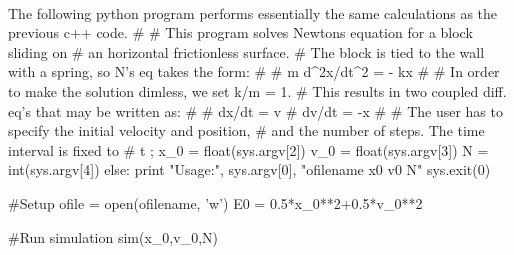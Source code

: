 \documentclass[%
oneside,                 %
final,                   %
10pt]{article}
\begin{document}
\paragraph{}
The following python program performs essentially the same calculations as the previous c++ code.
\bpypro
#
# This program solves Newtons equation for a block sliding on
# an horizontal frictionless surface.
# The block is tied to the wall with a spring, so N's eq takes the form:
#
#  m d^2x/dt^2 = - kx
#
# In order to make the solution dimless, we set k/m = 1.
# This results in two coupled diff. eq's that may be written as:
#
#  dx/dt = v
#  dv/dt = -x
#
# The user has to specify the initial velocity and position,
# and the number of steps. The time interval is fixed to
# t \in [0, 4\pi) (two periods)
#
# Note that this is a highly simplifyed rk4 code, intended
# for conceptual understanding and experimentation.

import sys
import numpy, math

#Global variables
ofile = None;
E0    = 0.0

def sim(x_0, v_0, N):
    ts = 0.0
    te = 4*math.pi
    h = (te-ts)/float(N)

    t = ts;
    x = x_0
    v = v_0
    while (t < te):
        kv1 = -h*x
        kx1 = h*v

        kv2 = -h*(x+kx1/2)
        kx2 =  h*(v+kv1/2)

        kv3 = -h*(x+kx2/2)
        kx3 =  h*(v+kv2/2)

        kv4 = -h*(x+kx3/2)
        kx4 =  h*(v+kv3/2)

        #Write the old values to file
        output(t,x,v)

        #Update
        x = x + (kx1 + 2*(kx2+kx3) + kx4)/6
        v = v + (kv1 + 2*(kv2+kv3) + kv4)/6
        t = t+h
        
def output(t,x,v):
    de = 0.5*x**2+0.5*v**2 - E0;
    ofile.write("%


#MAIN PROGRAM:

#Get input
if len(sys.argv) == 5:
    ofilename =       sys.argv[1];
    x_0       = float(sys.argv[2])
    v_0       = float(sys.argv[3])
    N         =   int(sys.argv[4])
else:
    print "Usage:", sys.argv[0], "ofilename x0 v0 N"
    sys.exit(0)

#Setup
ofile = open(ofilename, 'w')
E0    = 0.5*x_0**2+0.5*v_0**2

#Run simulation
sim(x_0,v_0,N)
\end{document}
